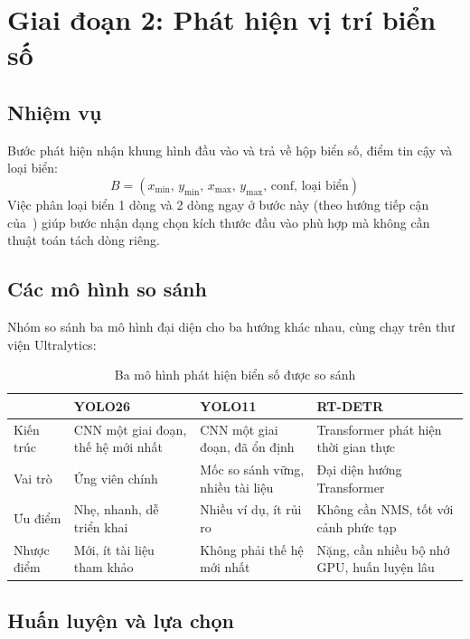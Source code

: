 \section{Giai đoạn 2: Phát hiện vị trí biển số}

\subsection{Nhiệm vụ}

Bước phát hiện nhận khung hình đầu vào và trả về hộp biển số, điểm tin cậy và loại biển:
\[
  B = (x_{\min},\, y_{\min},\, x_{\max},\, y_{\max},\, \text{conf},\, \text{loại biển})
\]
Việc phân loại biển 1 dòng và 2 dòng ngay ở bước này (theo hướng tiếp cận của~\cite{trinh2022}) giúp bước nhận dạng chọn kích thước đầu vào phù hợp mà không cần thuật toán tách dòng riêng.

\subsection{Các mô hình so sánh}

Nhóm so sánh ba mô hình đại diện cho ba hướng khác nhau, cùng chạy trên thư viện Ultralytics:

\begin{table}[H]
\centering
\small
\begin{tabularx}{\textwidth}{|>{\RaggedRight}p{2.6cm}|>{\RaggedRight}X|>{\RaggedRight}X|>{\RaggedRight\arraybackslash}X|}
\hline
 & \textbf{YOLO26} & \textbf{YOLO11} & \textbf{RT-DETR} \\
\hline
Kiến trúc & CNN một giai đoạn, thế hệ mới nhất & CNN một giai đoạn, đã ổn định & Transformer phát hiện thời gian thực \\
\hline
Vai trò & Ứng viên chính & Mốc so sánh vững, nhiều tài liệu & Đại diện hướng Transformer \\
\hline
Ưu điểm & Nhẹ, nhanh, dễ triển khai & Nhiều ví dụ, ít rủi ro & Không cần NMS, tốt với cảnh phức tạp \\
\hline
Nhược điểm & Mới, ít tài liệu tham khảo & Không phải thế hệ mới nhất & Nặng, cần nhiều bộ nhớ GPU, huấn luyện lâu \\
\hline
\end{tabularx}
\caption{Ba mô hình phát hiện biển số được so sánh}
\label{tab:detectors}
\end{table}

\subsection{Huấn luyện và lựa chọn}

